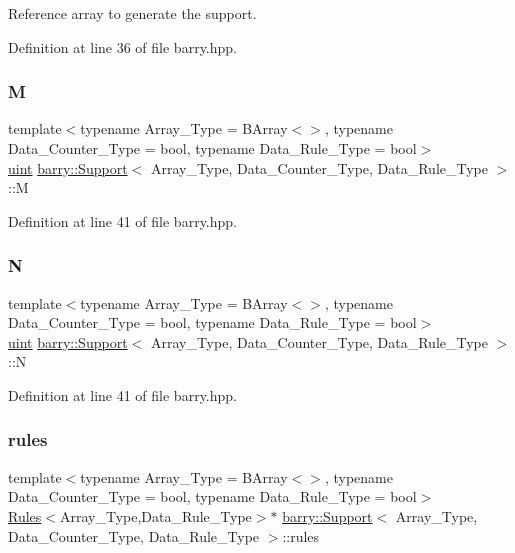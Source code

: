 Reference array to generate the support. 



Definition at line 36 of file barry.\+hpp.

\mbox{\label{classbarry_1_1_support_abdf54592050a1c0db0fc7b079a7f9703}} 
\subsubsection{\texorpdfstring{M}{M}}
{\footnotesize\ttfamily template$<$typename Array\+\_\+\+Type  = B\+Array$<$$>$, typename Data\+\_\+\+Counter\+\_\+\+Type  = bool, typename Data\+\_\+\+Rule\+\_\+\+Type  = bool$>$ \\
\hyperlink{namespacebarry_a11dfc53ddb4672278319aa04f1e09a6c}{uint} \hyperlink{classbarry_1_1_support}{barry\+::\+Support}$<$ Array\+\_\+\+Type, Data\+\_\+\+Counter\+\_\+\+Type, Data\+\_\+\+Rule\+\_\+\+Type $>$\+::M}



Definition at line 41 of file barry.\+hpp.

\mbox{\label{classbarry_1_1_support_a776221deb92d113e5dee1cb100174ed4}} 
\subsubsection{\texorpdfstring{N}{N}}
{\footnotesize\ttfamily template$<$typename Array\+\_\+\+Type  = B\+Array$<$$>$, typename Data\+\_\+\+Counter\+\_\+\+Type  = bool, typename Data\+\_\+\+Rule\+\_\+\+Type  = bool$>$ \\
\hyperlink{namespacebarry_a11dfc53ddb4672278319aa04f1e09a6c}{uint} \hyperlink{classbarry_1_1_support}{barry\+::\+Support}$<$ Array\+\_\+\+Type, Data\+\_\+\+Counter\+\_\+\+Type, Data\+\_\+\+Rule\+\_\+\+Type $>$\+::N}



Definition at line 41 of file barry.\+hpp.

\mbox{\label{classbarry_1_1_support_a9311c3288f59feaece0680f9a7b630dd}} 
\subsubsection{\texorpdfstring{rules}{rules}}
{\footnotesize\ttfamily template$<$typename Array\+\_\+\+Type  = B\+Array$<$$>$, typename Data\+\_\+\+Counter\+\_\+\+Type  = bool, typename Data\+\_\+\+Rule\+\_\+\+Type  = bool$>$ \\
\hyperlink{classbarry_1_1_rules}{Rules}$<$Array\+\_\+\+Type,Data\+\_\+\+Rule\+\_\+\+Type$>$$\ast$ \hyperlink{classbarry_1_1_support}{barry\+::\+Support}$<$ Array\+\_\+\+Type, Data\+\_\+\+Counter\+\_\+\+Type, Data\+\_\+\+Rule\+\_\+\+Type $>$\+::rules}




